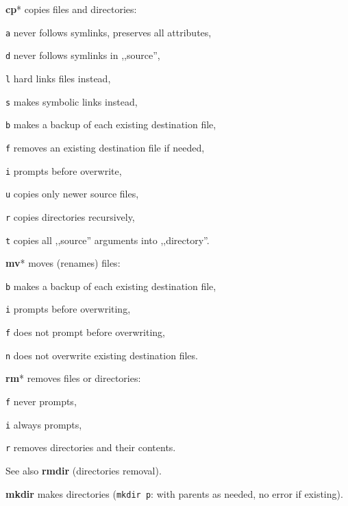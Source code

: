 \begin{enumx}
	\item [\cmd] \textbf{cp}* copies files and directories:
	\item [\texttt{a}] never follows symlinks, preserves all attributes,
	\item [\texttt{d}] never follows symlinks in ,,source'',
	\item [\texttt{l}] hard links files instead,
	\item [\texttt{s}] makes symbolic links instead,
	\item [\texttt{b}] makes a backup of each existing destination file,
	\item [\texttt{f}] removes an existing destination file if needed,
	\item [\texttt{i}] prompts before overwrite,
	\item [\texttt{u}] copies only newer source files,
	\item [\texttt{r}] copies directories recursively,
	\item [\texttt{t}] copies all ,,source'' arguments into ,,directory''.
	
	\item [\cmd] \textbf{mv}* moves (renames) files:
	\item [\texttt{b}] makes a backup of each existing destination file,
	\item [\texttt{i}] prompts before overwriting,
	\item [\texttt{f}] does not prompt before overwriting,
	\item [\texttt{n}] does not overwrite existing destination files.
	
	\item [\cmd] \textbf{rm}* removes files or directories:
	\item [\texttt{f}] never prompts,
	\item [\texttt{i}] always prompts,
	\item [\texttt{r}] removes directories and their contents.

	\item [\cmd] See also \textbf{rmdir} (directories removal).

	\item [\cmd] \textbf{mkdir} makes directories (\texttt{mkdir p}: with parents as needed, no error if existing).
\end{enumx}

